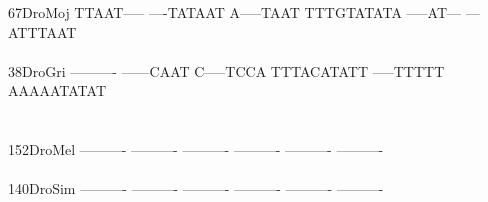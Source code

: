 \documentclass[11pt,twoside,reqno,a4paper]{article}
\begin{document}
{67\hspace*{3\charwidth}DroMoj	TTAAT-----	----TATAAT	A-----TAAT	TTTGTATATA	-----AT---	---ATTTAAT	\\
\hspace*{5\charwidth}\hspace*{7\charwidth}\hspace*{1\charwidth}\hspace*{1\charwidth}\hspace*{1\charwidth}\hspace*{1\charwidth}\hspace*{1\charwidth}\hspace*{1\charwidth}\\
38\hspace*{3\charwidth}DroGri	----------	------CAAT	C-----TCCA	TTTACATATT	-----TTTTT	AAAAATATAT	\\
\hspace*{5\charwidth}\hspace*{7\charwidth}\hspace*{1\charwidth}\hspace*{1\charwidth}\hspace*{1\charwidth}\hspace*{1\charwidth}\hspace*{1\charwidth}\hspace*{1\charwidth}\\
\\
152\hspace*{2\charwidth}DroMel	----------	----------	----------	----------	----------	----------	\\
\hspace*{5\charwidth}\hspace*{7\charwidth}\hspace*{1\charwidth}\hspace*{1\charwidth}\hspace*{1\charwidth}\hspace*{1\charwidth}\hspace*{1\charwidth}\hspace*{1\charwidth}\\
140\hspace*{2\charwidth}DroSim	----------	----------	----------	----------	----------	----------	\\
\hspace*{5\charwidth}\hspace*{7\charwidth}\hspace*{1\charwidth}\hspace*{1\charwidth}\hspace*{1\charwidth}\hspace*{1\charwidth}\hspace*{1\charwidth}\hspace*{1\charwidth}\\
}
\end{document}

